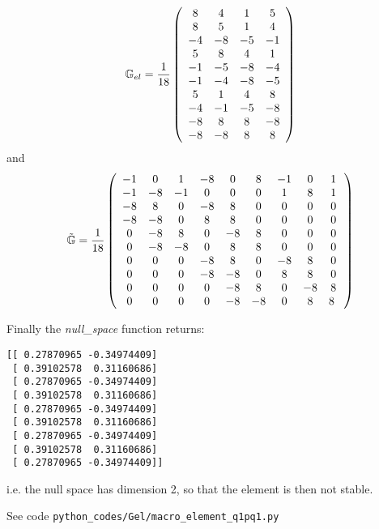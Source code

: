\[
{\mathbb{G}}_{el}=
\frac{1}{18}
\left(
\begin{array}{cccc}
 8&  4&  1&  5\\
 8&  5&  1&  4\\
-4& -8& -5& -1\\
 5&  8&  4&  1\\
-1& -5& -8& -4\\
-1& -4& -8& -5\\
 5&  1&  4&  8\\
-4& -1& -5& -8\\
-8&  8&  8& -8\\
-8& -8&  8&  8
\end{array}
\right)
\]
and 
\[
\tilde{{\mathbb{G}}}
=
\frac{1}{18}
\left(
\begin{array}{ccccccccc}
 -1  &   0 &   1 &  -8 &   0 &    8 &  -1 &   0 &   1 \\ 
 -1  &  -8 &  -1 &   0 &   0 &    0 &   1 &   8 &   1 \\ 
 -8  &   8 &   0 &  -8 &   8 &    0 &   0 &   0 &   0 \\ 
 -8  &  -8 &   0 &   8 &   8 &    0 &   0 &   0 &   0 \\ 
  0  &  -8 &   8 &   0 &  -8 &    8 &   0 &   0 &   0 \\ 
  0  &  -8 &  -8 &   0 &   8 &    8 &   0 &   0 &   0 \\ 
  0  &   0 &   0 &  -8 &   8 &    0 &  -8 &   8 &   0 \\ 
  0  &   0 &   0 &  -8 &  -8 &    0 &   8 &   8 &   0 \\ 
  0  &   0 &   0 &   0 &  -8 &    8 &   0 &  -8 &   8 \\ 
  0  &   0 &   0 &   0 &  -8 &   -8 &   0 &   8 &   8 \
\end{array}
\right)
\]




Finally the {\sl null\_space} function returns:
\begin{verbatim}
[[ 0.27870965 -0.34974409]
 [ 0.39102578  0.31160686]
 [ 0.27870965 -0.34974409]
 [ 0.39102578  0.31160686]
 [ 0.27870965 -0.34974409]
 [ 0.39102578  0.31160686]
 [ 0.27870965 -0.34974409]
 [ 0.39102578  0.31160686]
 [ 0.27870965 -0.34974409]]
\end{verbatim}
i.e. the null space has dimension 2, so that the element is then not stable. 



See code {\tt python\_codes/Gel/macro\_element\_q1pq1.py}



